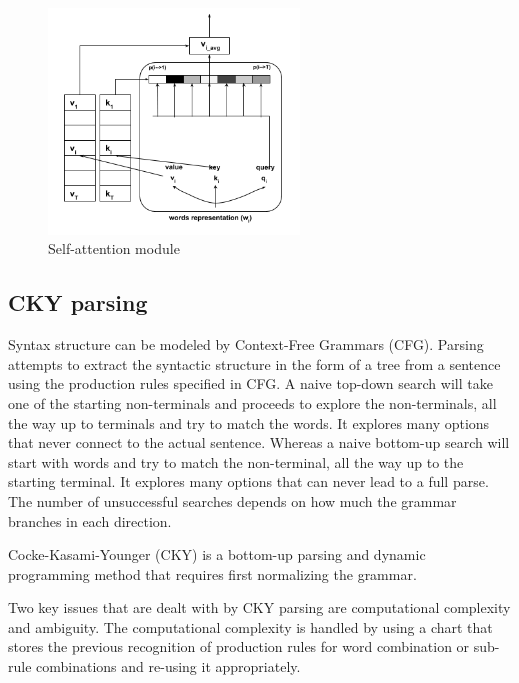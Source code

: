\documentclass[a4paper, 11pt]{article}
\begin{document}
\begin{figure}[H]
    \centering
    \includegraphics[width=\textwidth,height=6cm,keepaspectratio=true]
    {self-attention.png}
    \caption{
        Self-attention module
    }
    \label{fig:Self attention head}
\end{figure}


\subsection{CKY parsing}


Syntax structure can be modeled by Context-Free Grammars (CFG). Parsing attempts to extract the syntactic structure in the form of a tree from a sentence using the production rules specified in CFG.  A naive top-down search will take one of the starting non-terminals and proceeds to explore the non-terminals, all the way up to terminals and try to match the words. It explores many options that never connect to the actual sentence. Whereas a naive bottom-up search will start with words and try to match the non-terminal, all the way up to the starting terminal. It explores many options that can never lead to a full parse. The number of unsuccessful searches depends on how much the grammar branches in each direction.

Cocke-Kasami-Younger (CKY) \parencite{YOUNGER1967189} is a bottom-up parsing and dynamic programming method that requires first normalizing the grammar. 

Two key issues that are dealt with by CKY parsing are computational complexity and ambiguity. The computational complexity is handled by using a chart that stores the previous recognition of production rules for word combination or sub-rule combinations and re-using it appropriately. 
\end{document}
